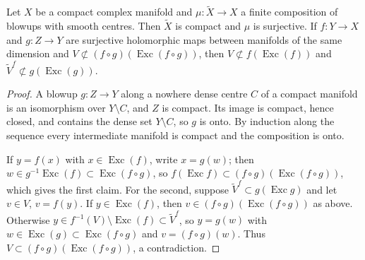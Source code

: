\begin{lemma}
\label{ana:blowup-surjective}
\leanok
Let \(X\) be a compact complex manifold and \(\mu:\widetilde X\to X\) a finite
composition of blowups with smooth centres. Then \(\widetilde X\) is compact and
\(\mu\) is surjective. If \(f:Y\to X\) and \(g:Z\to Y\) are surjective
holomorphic maps between manifolds of the same dimension and
\(V\not\subset(f\circ g)(\operatorname{Exc}(f\circ g))\), then
\(V\not\subset f(\operatorname{Exc}(f))\) and
\(\widetilde V^{f}\not\subset g(\operatorname{Exc}(g))\).
\end{lemma}
\begin{proof}
\leanok
A blowup \(g:Z\to Y\) along a nowhere dense centre \(C\) of a compact manifold is
an isomorphism over \(Y\setminus C\), and \(Z\) is compact. Its image is compact,
hence closed, and contains the dense set \(Y\setminus C\), so \(g\) is onto. By
induction along the sequence every intermediate manifold is compact and the
composition is onto.

If \(y=f(x)\) with \(x\in\operatorname{Exc}(f)\), write \(x=g(w)\); then
\(w\in g^{-1}\operatorname{Exc}(f)\subset\operatorname{Exc}(f\circ g)\), so
\(f(\operatorname{Exc} f)\subset(f\circ g)(\operatorname{Exc}(f\circ g))\), which
gives the first claim. For the second, suppose
\(\widetilde V^{f}\subset g(\operatorname{Exc} g)\) and let \(v\in V\), \(v=f(y)\).
If \(y\in\operatorname{Exc}(f)\), then \(v\in(f\circ g)(\operatorname{Exc}(f\circ g))\)
as above. Otherwise \(y\in f^{-1}(V)\setminus\operatorname{Exc}(f)\subset\widetilde V^{f}\),
so \(y=g(w)\) with \(w\in\operatorname{Exc}(g)\subset\operatorname{Exc}(f\circ g)\)
and \(v=(f\circ g)(w)\). Thus \(V\subset(f\circ g)(\operatorname{Exc}(f\circ g))\), a
contradiction.
\end{proof}

